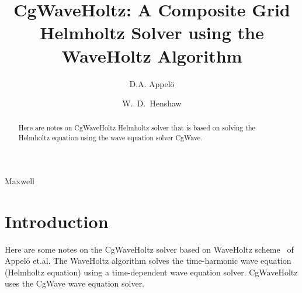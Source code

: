 \documentclass[preprint,11pt]{elsarticle}
\begin{document}
\small
{}
\lstset{style=myc}

\begin{frontmatter}
\title{
CgWaveHoltz: A Composite Grid Helmholtz Solver using the WaveHoltz Algorithm
}

\author[cu]{D.A. Appel\"o}
\author[rpi]{W.~D.~Henshaw}

\address[cu]{University of Colorado, Boulder.}
\address[rpi]{Department of Mathematical Sciences, Rensselaer Polytechnic Institute, Troy, NY 12180, USA}





\begin{abstract}

  Here are notes on CgWaveHoltz Helmholtz solver that is based on solving the Helmholtz equation
  using the wave equation solver CgWave.

\end{abstract}

\begin{keyword}
Maxwell
\end{keyword}

\end{frontmatter}


\tableofcontents
%

\section{Introduction}
Here are some notes on the CgWaveHoltz solver based on WaveHoltz scheme~\cite{appelo2020waveholtz} of Appel\"o et.al.
The WaveHoltz algorithm solves the time-harmonic wave equation (Helmholtz equation)
using a time-dependent wave equation solver. CgWaveHoltz uses the CgWave wave equation solver. 
\end{document}
